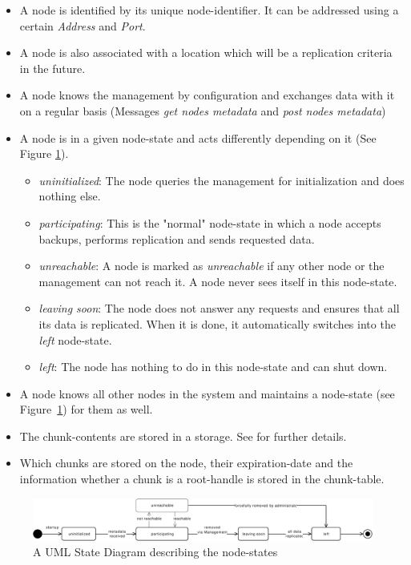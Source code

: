 \begin{itemize}
    \item A \gls{node} is identified by its unique \gls{node-identifier}. It can be addressed using a certain \emph{Address} and \emph{Port}.
    \item A \gls{node} is also associated with a \gls{location} which will be a replication criteria in the future.
    \item A \gls{node} knows the \gls{management} by configuration and exchanges data with it on a regular basis (Messages \emph{get nodes metadata} and \emph{post nodes metadata})
    \item A \gls{node} is in a given \gls{node-state} and acts differently depending on it (See Figure \ref{fig:node-states}).
    \begin{itemize}
        \item \emph{uninitialized}: The \gls{node} queries the \gls{management} for initialization and does nothing else.
        \item \emph{participating}: This is the "normal" \gls{node-state} in which a \gls{node} accepts backups, performs replication and sends requested data.
        \item \emph{unreachable}: A \gls{node} is marked as \emph{unreachable} if any other \gls{node} or the \gls{management} can not reach it. A \gls{node} never sees itself in this \gls{node-state}.
        \item  \emph{leaving soon}: The \gls{node} does not answer any requests and ensures that all its data is replicated. When it is done, it automatically switches into the \emph{left} \gls{node-state}.
        \item \emph{left}: The \gls{node} has nothing to do in this \gls{node-state} and can shut down.
    \end{itemize}
    \item A \gls{node} knows all other \glspl{node} in the \gls{system} and maintains a \gls{node-state} (see Figure~\ref{fig:node-states}) for them as well.
    \item The \glspl{chunk-content} are stored in a \gls{storage}. See  for further details.
    \item Which \glspl{chunk} are stored on the \gls{node}, their \gls{expiration-date} and the information whether a \gls{chunk} is a \gls{root-handle} is stored in the \gls{chunk-table}.
\end{itemize}

\begin{figure}[h]
    \centering
    \includegraphics[width=1\linewidth]{resources/node_state}
    \caption[Node States]{A UML State Diagram describing the \glspl{node-state}}
    \label{fig:node-states}
\end{figure}

